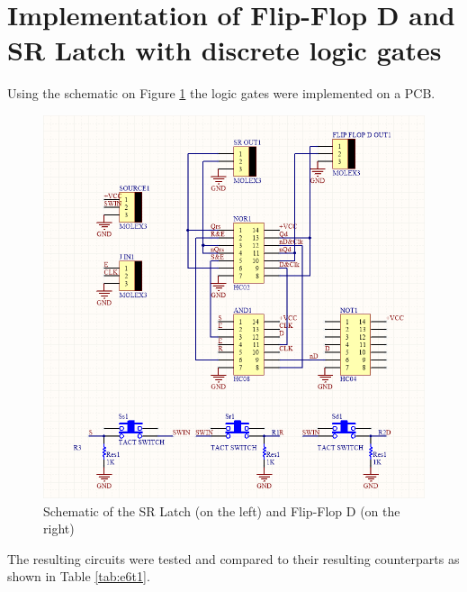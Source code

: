 \documentclass[a4paper]{article}
\begin{document}
        \section{Implementation of Flip-Flop D and SR Latch with discrete logic gates}
        Using the schematic on Figure \ref{fig:Schem} the logic gates were implemented on a PCB.
        
        \begin{figure}[h!]
            \begin{center}
                \includegraphics[width=\linewidth]{e6Schem.png}
                \caption{Schematic of the  SR Latch (on the left) and Flip-Flop D (on the right)}
            \end{center}
            \label{fig:Schem}
        \end{figure}

        The resulting circuits were tested and compared to their resulting counterparts as shown in Table \ref{tab:e6t1}.
        \begin{table}[ht]
            \begin{center}
                
            \end{center}
            \label{tab:e6t1}
        \end{table}
        \begin{table}[ht]
            \begin{center}
                
            \end{center}
            \label{tab:e6t2}
        \end{table}
        
    
\end{document}

